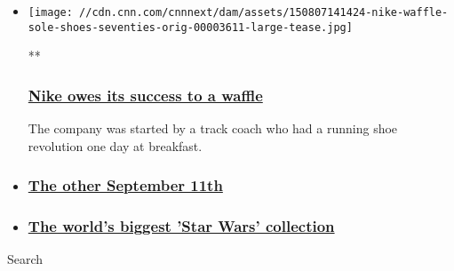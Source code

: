 \begin{itemize}
\item
  \href{/videos/living/2015/08/07/nike-waffle-sole-shoes-seventies-orig.cnn}{}

  \texttt{[image: //cdn.cnn.com/cnnnext/dam/assets/150807141424-nike-waffle-sole-shoes-seventies-orig-00003611-large-tease.jpg]}

  **

  \hypertarget{nike-owes-its-success-to-a-waffle-}{%
  \subsubsection{\texorpdfstring{\href{/videos/living/2015/08/07/nike-waffle-sole-shoes-seventies-orig.cnn}{Nike
  owes its success to a waffle
  }}{Nike owes its success to a waffle }}\label{nike-owes-its-success-to-a-waffle-}}

  The company was started by a track coach who had a running shoe
  revolution one day at breakfast.
\item
  \hypertarget{the-other-september-11th}{%
  \subsubsection{\texorpdfstring{\href{/videos/politics/2015/07/24/1970s-the-other-september-11-js-origwx.cnn}{The
  other September
  11th}}{The other September 11th}}\label{the-other-september-11th}}
\item
  \hypertarget{the-worlds-biggest-star-wars-collection}{%
  \subsubsection{\texorpdfstring{\href{/videos/us/2015/07/10/orig-the-seventies-biggest-star-wars-collection-in-the-world.cnn}{The
  world's biggest 'Star Wars'
  collection}}{The world's biggest 'Star Wars' collection}}\label{the-worlds-biggest-star-wars-collection}}
\end{itemize}

Search

